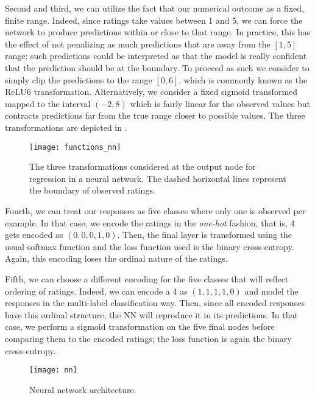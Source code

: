 \documentclass[bj, preprint]{imsart}
\begin{document}
Second and third, we can utilize the fact that our numerical outcome as a fixed, finite range. Indeed, since ratings take values between 1 and 5, we can force the network to produce predictions within or close to that range. In practice, this has the effect of not penalizing as much predictions that are away from the $[1,5]$ range: such predictions could be interpreted as that the model is really confident that the prediction should be at the boundary. To proceed as such we consider to simply clip the predictions to the range $[0,6]$, which is commonly known as the ReLU6 transformation. Alternatively, we consider a fixed sigmoid transformed mapped to the interval $(-2,8)$ which is fairly linear for the observed values but contracts predictions far from the true range closer to possible values. The three transformations are depicted in .

\begin{figure}[h]
\centering
\texttt{[image: functions\_nn]}
\caption{The three transformations considered at the output node for regression in a neural network. The dashed horizontal lines represent the boundary of observed ratings. }\label{fig:method.models.nn.functions}
\end{figure}

Fourth, we can treat our responses as five classes where only one is observed per example. In that case, we encode the ratings in the \textit{one-hot} fashion, that is, 4 gets encoded as $(0,0,0,1,0)$. Then, the final layer is transformed using the usual softmax function and the loss function used is the binary cross-entropy. Again, this encoding loses the ordinal nature of the ratings.

Fifth, we can choose a different encoding for the five classes that will reflect ordering of ratings. Indeed, we can encode a 4 as $(1,1,1,1,0)$ and model the responses in the multi-label classification way. Then, since all encoded responses have this ordinal structure, the NN will reproduce it in its predictions. In that case, we perform a sigmoid transformation on the five final nodes before comparing them to the encoded ratings; the loss function is again the binary cross-entropy.


\begin{figure}
\centering
	\texttt{[image: nn]}
	\caption{Neural network architecture.}
	\label{fig:method.models.nn}
\end{figure}

%
\end{document}
